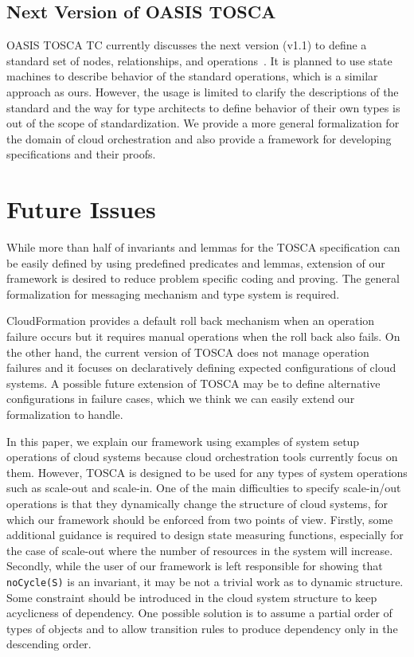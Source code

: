\documentclass[12pt]{report}
\newcommand{\stt}[1]{{\small{\tt {#1}}}}
\begin{document}
\subsection{Next Version of OASIS TOSCA}
OASIS TOSCA TC currently discusses the next version (v1.1) to define a
standard set of nodes, relationships, and
operations~\cite{TOSCAYAML}. It is planned to use state machines to
describe behavior of the standard operations, which is a similar
approach as ours. However, the usage is limited to clarify the
descriptions of the standard and the way for type architects to define
behavior of their own types is out of the scope of standardization. We
provide a more general formalization for the domain of cloud
orchestration and also provide a framework for developing
specifications and their proofs.

\section{Future Issues}
While more than half of invariants and lemmas for the TOSCA
specification can be easily defined by using predefined predicates and
lemmas, extension of our framework is desired to reduce problem
specific coding and proving. The general formalization for messaging
mechanism and type system is required.

CloudFormation provides a default roll back mechanism when an
operation failure occurs but it requires manual operations when the
roll back also fails. On the other hand, the current version of TOSCA
does not manage operation failures and it focuses on declaratively
defining expected configurations of cloud systems. A possible
future extension of TOSCA may be to define alternative configurations
in failure cases, which we think we can easily extend our
formalization to handle.

In this paper, we explain our framework using examples of system setup
operations of cloud systems because cloud orchestration tools
currently focus on them. However, TOSCA is designed to be used for any
types of system operations such as scale-out and scale-in. One of the
main difficulties to specify scale-in/out operations is that they
dynamically change the structure of cloud systems, for which our
framework should be enforced from two points of view. Firstly, some
additional guidance is required to design state measuring functions,
especially for the case of scale-out where the number of resources in
the system will increase. Secondly, while the user of our framework is
left responsible for showing that \stt{noCycle(S)} is an invariant, it
may be not a trivial work as to dynamic structure. Some constraint
should be introduced in the cloud system structure to keep acyclicness
of dependency. One possible solution is to assume a partial order of
types of objects and to allow transition rules to produce dependency only
in the descending order.
\end{document}
